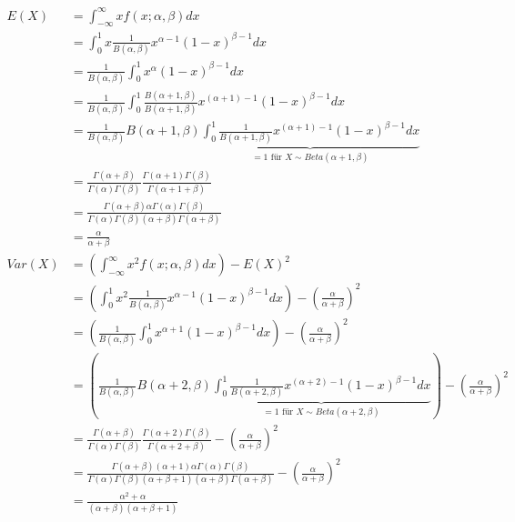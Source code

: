 \documentclass{article}
\begin{document}
\begin{align*}
    E(X) &= \int_{-\infty}^{\infty} x f(x; \alpha, \beta) dx \\
    &= \int_{0}^{1} x \frac{1}{B(\alpha, \beta)}x^{\alpha - 1} (1-x)^{\beta - 1} dx \\
    &= \frac{1}{B(\alpha, \beta)} \int_0^1 x^{\alpha} (1-x)^{\beta -1} dx \\    
    &= \frac{1}{B(\alpha, \beta)} \int_{0}^{1} \frac{B(\alpha +1, \beta)}{B(\alpha +1, \beta)} x^{(\alpha + 1) - 1}(1-x)^{\beta - 1} dx \\
    &= \frac{1}{B(\alpha, \beta)} B(\alpha + 1, \beta) \underbrace{\int_{0}^{1} \frac{1}{B(\alpha + 1, \beta)} x^{(\alpha+1)-1} (1-x)^{\beta -1} dx}_{= 1 \text{ für } X \sim Beta(\alpha + 1, \beta)} \\
    &= \frac{\Gamma(\alpha + \beta)}{\Gamma(\alpha)\Gamma(\beta)}\frac{\Gamma(\alpha + 1)\Gamma(\beta)}{\Gamma(\alpha + 1 + \beta)} \\
    &= \frac{\Gamma(\alpha + \beta) \alpha \Gamma(\alpha)\Gamma(\beta) }{\Gamma(\alpha)\Gamma(\beta)(\alpha+\beta)\Gamma(\alpha + \beta)} \\
    &= \frac{\alpha }{\alpha + \beta} \\
    Var(X) &= \left(\int_{-\infty}^{\infty} x^2 f(x; \alpha, \beta) dx\right) - E(X)^2 \\
    &= \left(\int_{0}^{1} x^2 \frac{1}{B(\alpha, \beta)}x^{\alpha - 1} (1-x)^{\beta - 1} dx\right) - \left(\frac{\alpha}{\alpha + \beta}\right)^2 \\
    &= \left(\frac{1}{B(\alpha, \beta)} \int_{0}^{1} x^{\alpha + 1} (1-x)^{\beta - 1} dx\right) - \left(\frac{\alpha}{\alpha + \beta}\right)^2 \\
    &= \left(\frac{1}{B(\alpha, \beta)} B(\alpha + 2, \beta) \underbrace{\int_{0}^{1} \frac{1}{B(\alpha +2, \beta)} x^{(\alpha + 2)-1} (1-x)^{\beta - 1} dx}_{= 1 \text{ für } X \sim Beta(\alpha + 2, \beta)}\right) - \left(\frac{\alpha}{\alpha + \beta}\right)^2 \\
    &= \frac{\Gamma(\alpha + \beta)}{\Gamma(\alpha)\Gamma(\beta)}\frac{\Gamma(\alpha + 2)\Gamma(\beta)}{\Gamma(\alpha + 2 + \beta)} - \left(\frac{\alpha}{\alpha + \beta}\right)^2 \\
    &= \frac{\Gamma(\alpha + \beta) (\alpha + 1 ) \alpha \Gamma(\alpha)\Gamma(\beta)}{\Gamma(\alpha)\Gamma(\beta)(\alpha+\beta +1) (\alpha + \beta)\Gamma(\alpha + \beta)} - \left(\frac{\alpha}{\alpha + \beta}\right)^2 \\
    &= \frac{\alpha^2 + \alpha}{(\alpha + \beta) (\alpha + \beta + 1)} \\

\end{align*}
\end{document}
